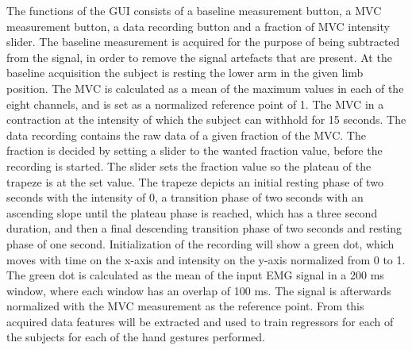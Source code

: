 The functions of the GUI consists of a baseline measurement button, a MVC measurement button, a data recording button and a fraction of MVC intensity slider. The baseline measurement is acquired for the purpose of being subtracted from the signal, in order to remove the signal artefacts that are present. At the baseline acquisition the subject is resting the lower arm in the given limb position. The MVC is calculated as a mean of the maximum values in each of the eight channels, and is set as a normalized reference point of 1. The MVC in a contraction at the intensity of which the subject can withhold for 15 seconds. The data recording contains the raw data of a given fraction of the MVC. The fraction is decided by setting a slider to the wanted fraction value, before the recording is started. The slider sets the fraction value so the plateau of the trapeze is at the set value. The trapeze depicts an initial resting phase of two seconds with the intensity of 0, a transition phase of two seconds with an ascending slope until the plateau phase is reached, which has a three second duration, and then a final descending transition phase of two seconds and resting phase of one second. Initialization of the recording will show a green dot, which moves with time on the x-axis and intensity on the y-axis normalized from 0 to 1. The green dot is calculated as the mean of the input EMG signal in a 200 ms window, where each window has an overlap of 100 ms. The signal is afterwards normalized with the MVC measurement as the reference point. From this acquired data features will be extracted and used to train regressors for each of the subjects for each of the hand gestures performed.








